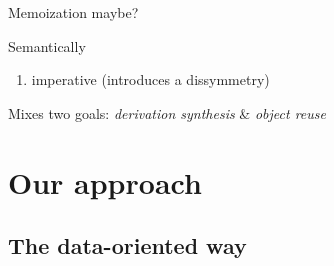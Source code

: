 \documentclass[ignorenonframetext,red]{beamer}
\begin{document}
\begin{frame}[fragile]{Memoization maybe?}
\begin{block}{Semantically}
\begin{enumerate}
{        
      }
      \pause
    \item[\itminus] imperative (introduces a dissymmetry)
    \end{enumerate}
  \end{block}
  \pause
  {\footnotesize Mixes two goals:} {\large \it derivation synthesis}
  {\footnotesize \&} {\large \it object reuse}
\end{frame}

\section{Our approach}

\subsection{The data-oriented way}
\end{document}
